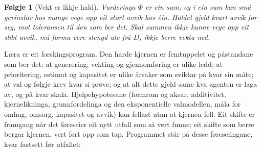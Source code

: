 \documentclass[9pt,twocolumn,a4paper]{article}
\theoremstyle{defstyle}
\theoremstyle{formstyle}
\newtheorem{folgje}{Følgje}
\begin{document}
\begin{folgje}[Vekt er ikkje hald]
Vurderinga $\Phi$ er ein sum, og i ein sum kan små gevinstar hos mange vege opp eit stort avvik hos éin. Haldet gjeld kvart avvik for seg, mot toleransen til den som ber det. Skal summen ikkje kunne vege opp eit slikt avvik, må forma vere stengd ute frå $D$, ikkje berre vekta ned.
\end{folgje}

Læra er eit forskingsprogram. Den harde kjernen er femtuppelet og påstandane som ber det: at generering, vekting og gjennomføring er ulike ledd; at prioritering, estimat og kapasitet er ulike årsaker som sviktar på kvar sin måte; at val og følgje krev kvar si prøve; og at alt dette gjeld same kva agenten er laga av, og på kvar skala. Hjelpehypotesane (formrom og aksar, additivitet, kjernelikninga, grunnfordelinga og den eksponentielle valmodellen, måla for omhug, omsorg, kapasitet og avvik) kan fellast utan at kjernen fell. Eit skifte er framgang når det føreseier eit nytt utfall som så vert funne; eit skifte som berre bergar kjernen, vert ført opp som tap. Programmet står på desse føreseiingane, kvar fastsett før utfallet:
\end{document}
